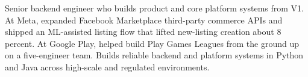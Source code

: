 


Senior backend engineer who builds product and core platform systems from V1. At Meta, expanded Facebook Marketplace third-party commerce APIs and shipped an ML-assisted listing flow that lifted new-listing creation about 8 percent. At Google Play, helped build Play Games Leagues from the ground up on a five-engineer team. Builds reliable backend and platform systems in Python and Java across high-scale and regulated environments.







